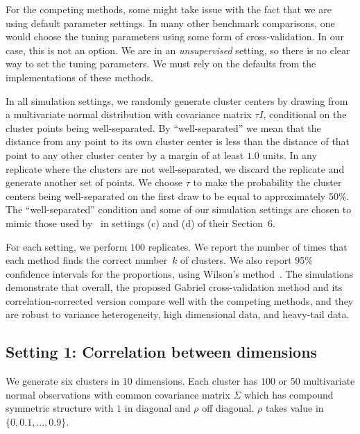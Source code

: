 \documentclass[12pt]{article}
\begin{document}
For the competing methods, some might take issue with the fact that we are
using default parameter settings.  In many other benchmark comparisons, one
would choose the tuning parameters using some form of cross-validation. In our
case, this is not an option. We are in an \emph{unsupervised} setting, so
there is no clear way to set the tuning parameters. We must rely on the
defaults from the implementations of these methods.


In all simulation settings, we randomly generate cluster centers by drawing
from a multivariate normal distribution with covariance matrix $\tau I$,
conditional on the cluster points being well-separated. By ``well-separated''
we mean that the distance from any point to its own cluster center is less
than the distance of that point to any other cluster center by a margin of
at least $1.0$ units. In any replicate where the clusters are not
well-separated, we discard the replicate and generate another set of points.
We choose $\tau$ to make the probability the cluster
centers being well-separated on the first draw to be equal to approximately
50\%.  The ``well-separated'' condition and some of our simulation settings
are chosen to mimic those used by~\cite{tibshirani2001estimating} in
settings (c) and (d) of their Section~6.


For each setting, we perform $100$ replicates. We report the number of times
that each method finds the correct number~$k$ of clusters. We also report 95\%
confidence intervals for the proportions, using Wilson's
method~\citep{wilson1927probable}.  The simulations demonstrate that overall,
the proposed Gabriel cross-validation method and its correlation-corrected
version compare well with the competing methods, and they are robust to
variance heterogeneity, high dimensional data, and heavy-tail data.


\subsection{Setting 1: Correlation between dimensions}

We generate six clusters in $10$ dimensions.  Each cluster has $100$ or $50$
multivariate normal observations with common covariance matrix $\Sigma$ which
has compound symmetric structure with $1$ in diagonal and $\rho$ off diagonal.
$\rho$ takes value in $\{0,0.1,...,0.9\}$.
	
\end{document}
